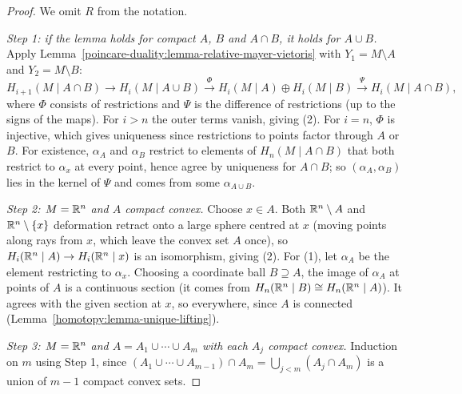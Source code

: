 \begin{proof}
We omit $R$ from the notation.

\emph{Step 1: if the lemma holds for compact $A$, $B$ and $A \cap B$, it holds for $A \cup B$.} Apply Lemma~\ref{poincare-duality:lemma-relative-mayer-vietoris} with
$Y_1 = M \setminus A$ and $Y_2 = M \setminus B$:
\[
H_{i+1}(M \mid A \cap B) \to H_i(M \mid A \cup B) \xrightarrow{\Phi} H_i(M \mid A) \oplus H_i(M \mid B) \xrightarrow{\Psi} H_i(M \mid A \cap B),
\]
where $\Phi$ consists of restrictions and $\Psi$ is the difference of restrictions (up to the signs of the maps). For $i > n$ the outer terms vanish, giving (2). For
$i = n$, $\Phi$ is injective, which gives uniqueness since restrictions to points factor through $A$ or $B$. For existence, $\alpha_A$ and $\alpha_B$ restrict to
elements of $H_n(M \mid A \cap B)$ that both restrict to $\alpha_x$ at every point, hence agree by uniqueness for $A \cap B$; so $(\alpha_A, \alpha_B)$ lies in the
kernel of $\Psi$ and comes from some $\alpha_{A \cup B}$.

\emph{Step 2: $M = \mathbb{R}^n$ and $A$ compact convex.} Choose $x \in A$. Both $\mathbb{R}^n \setminus A$ and $\mathbb{R}^n \setminus \{x\}$ deformation retract onto a large sphere centred at $x$
(moving points along rays from $x$, which leave the convex set $A$ once), so $H_i(\mathbb{R}^n \mid A) \to H_i(\mathbb{R}^n \mid x)$ is an isomorphism, giving (2). For (1), let
$\alpha_A$ be the element restricting to $\alpha_x$. Choosing a coordinate ball $B \supseteq A$, the image of $\alpha_A$ at points of $A$ is a continuous section (it
comes from $H_n(\mathbb{R}^n \mid B) \cong H_n(\mathbb{R}^n \mid A)$). It agrees with the given section at $x$, so everywhere, since $A$ is connected
(Lemma~\ref{homotopy:lemma-unique-lifting}).

\emph{Step 3: $M = \mathbb{R}^n$ and $A = A_1 \cup \cdots \cup A_m$ with each $A_j$ compact convex.} Induction on $m$ using Step 1, since
$(A_1 \cup \cdots \cup A_{m-1}) \cap A_m = \bigcup_{j < m}(A_j \cap A_m)$ is a union of $m - 1$ compact convex sets.


\end{proof}
